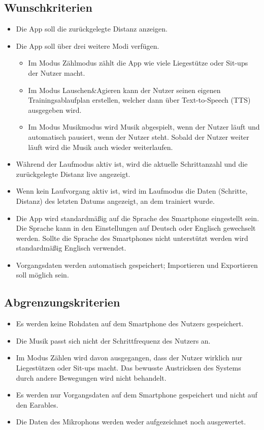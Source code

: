 \documentclass[a4paper,12pt]{article}
\begin{document}
\subsection{Wunschkriterien}
  \begin{itemize}
    \item Die App soll die zurückgelegte Distanz anzeigen.
    \item Die App soll über drei weitere Modi verfügen.
      \begin{itemize}
        \item Im Modus \glqq Zählmodus\grqq{} zählt die App wie viele Liegestütze oder Sit-ups der Nutzer macht.
        \item Im Modus \glqq Lauschen\&Agieren\grqq{} kann der Nutzer seinen eigenen Trainingsablaufplan erstellen, welcher dann über Text-to-Speech (\Gls{TTS}) ausgegeben wird.
        \item Im Modus \glqq Musikmodus\grqq{} wird Musik abgespielt, wenn der Nutzer läuft und automatisch pausiert, wenn der Nutzer steht. Sobald der Nutzer weiter läuft wird die Musik auch wieder weiterlaufen.
      \end{itemize}
    \item Während der \glqq Laufmodus\grqq{} aktiv ist, wird die aktuelle Schrittanzahl und die zurückgelegte Distanz live angezeigt.
    \item Wenn kein Laufvorgang aktiv ist, wird im Laufmodus die Daten (Schritte, Distanz) des letzten Datums angezeigt, an dem trainiert wurde. %
    \item Die App wird standardmäßig auf die Sprache des Smartphone eingestellt sein. Die Sprache kann in den Einstellungen auf Deutsch oder Englisch gewechselt werden. Sollte die Sprache des Smartphones nicht unterstützt werden wird standardmäßig Englisch verwendet. 
    \item Vorgangsdaten werden automatisch gespeichert; Importieren und Exportieren soll möglich sein.
  \end{itemize}
  \subsection{Abgrenzungskriterien}
  \begin{itemize}
    \item Es werden keine \Gls{Rohdaten} auf dem Smartphone des Nutzers gespeichert.
    \item Die Musik passt sich nicht der \Gls{Schrittfrequenz} des Nutzers an.
    \item Im Modus \glqq Zählen\grqq{} wird davon ausgegangen, dass der Nutzer wirklich nur Liegestützen oder Sit-ups macht. Das bewusste Austricksen des Systems durch andere Bewegungen wird nicht behandelt.
    \item Es werden nur Vorgangsdaten auf dem Smartphone gespeichert und nicht auf den \Gls{Earables}.
    \item Die Daten des Mikrophons werden weder aufgezeichnet noch ausgewertet.
  \end{itemize}
\clearpage
\end{document}
